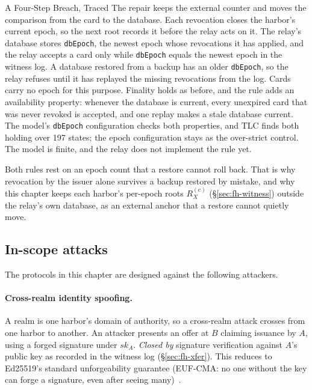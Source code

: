 \documentclass[11pt,a4paper]{article}
\theoremstyle{definition}
\theoremstyle{remark}
\begin{document}
\begin{pdexample}{A Four-Step Breach, Traced}
The repair keeps the external counter and moves the comparison from the card to the database. Each revocation closes the harbor's current epoch, so the next root records it before the relay acts on it. The relay's database stores \texttt{dbEpoch}, the newest epoch whose revocations it has applied, and the relay accepts a card only while \texttt{dbEpoch} equals the newest epoch in the witness log. A database restored from a backup has an older \texttt{dbEpoch}, so the relay refuses until it has replayed the missing revocations from the log. Cards carry no epoch for this purpose. Finality holds as before, and the rule adds an availability property: whenever the database is current, every unexpired card that was never revoked is accepted, and one replay makes a stale database current. The model's \texttt{dbEpoch} configuration checks both properties, and TLC finds both holding over 197 states; the epoch configuration stays as the over-strict control. The model is finite, and the relay does not implement the rule yet.

Both rules rest on an epoch count that a restore cannot roll back. That is why revocation by the issuer alone survives a backup restored by mistake, and why this chapter keeps each harbor's per-epoch roots $R_X^{(e)}$ (\S\ref{sec:fh-witness}) outside the relay's own database, as an external anchor that a restore cannot quietly move.
\end{pdexample}

\subsection{In-scope attacks}\label{sec:fh-attacks-in}

The protocols in this chapter are designed against the following attackers.

\paragraph{Cross-realm identity spoofing.} A realm is one harbor's domain of authority, so a cross-realm attack crosses from one harbor to another. An attacker presents an offer at $B$ claiming issuance by $A$, using a forged signature under $\mathit{sk}_A$. \emph{Closed by} signature verification against $A$'s public key as recorded in the witness log (\S\ref{sec:fh-xfer}). This reduces to Ed25519's standard unforgeability guarantee (EUF-CMA: no one without the key can forge a signature, even after seeing many)~.
\end{document}
